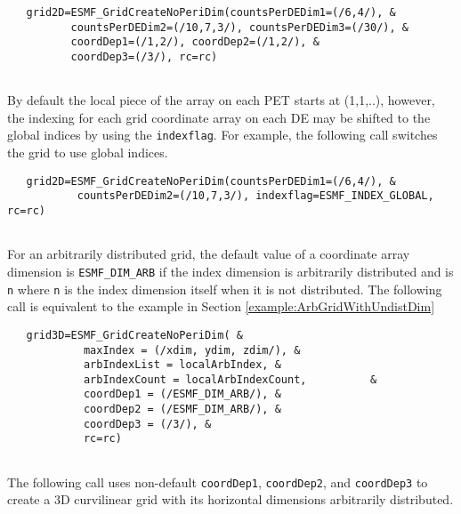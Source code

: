  \begin{verbatim}
   grid2D=ESMF_GridCreateNoPeriDim(countsPerDEDim1=(/6,4/), &
          countsPerDEDim2=(/10,7,3/), countsPerDEDim3=(/30/), &
          coordDep1=(/1,2/), coordDep2=(/1,2/), &
          coordDep3=(/3/), rc=rc)
 
\end{verbatim}
 

   By default the local piece of the array on each PET starts at
   (1,1,..), however, the indexing for each grid coordinate array
   on each DE may be shifted to the global indices by using the {\tt indexflag}.
   For example, the following call switches the grid to use global indices. 

 \begin{verbatim}
   grid2D=ESMF_GridCreateNoPeriDim(countsPerDEDim1=(/6,4/), &
           countsPerDEDim2=(/10,7,3/), indexflag=ESMF_INDEX_GLOBAL, rc=rc)
 
\end{verbatim}
 

   For an arbitrarily distributed grid, the default value of a coordinate
   array dimension is {\tt ESMF\_DIM\_ARB} if the index dimension is arbitrarily
   distributed and is {\tt n} where {\tt n} is the index dimension itself when it is not
   distributed. The following call is equivalent to the example in
   Section \ref{example:ArbGridWithUndistDim} 

 \begin{verbatim}
   grid3D=ESMF_GridCreateNoPeriDim( &
            maxIndex = (/xdim, ydim, zdim/), &
            arbIndexList = localArbIndex, &
            arbIndexCount = localArbIndexCount,          &
            coordDep1 = (/ESMF_DIM_ARB/), &
            coordDep2 = (/ESMF_DIM_ARB/), &
            coordDep3 = (/3/), &
            rc=rc)
 
\end{verbatim}
 

   The following call uses non-default {\tt coordDep1}, {\tt coordDep2},
   and {\tt coordDep3} to create a 3D curvilinear grid with its horizontal
   dimensions arbitrarily distributed. 

